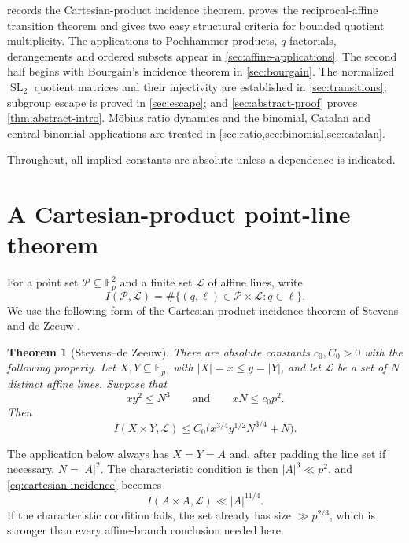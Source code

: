 \documentclass[11pt,reqno]{amsart}
\numberwithin{equation}{section}
\newtheorem{theorem}{Theorem}[section]
\theoremstyle{definition}
\theoremstyle{remark}
\newcommand{\F}{\mathbb F}
\newcommand{\SL}{\operatorname{SL}}
\newcommand{\cL}{\mathcal L}
\newcommand{\cP}{\mathcal P}
\begin{document}
 records the Cartesian-product incidence theorem.   proves the reciprocal-affine transition theorem and gives two easy structural criteria for bounded quotient multiplicity.  The applications to Pochhammer products, $q$-factorials, derangements and ordered subsets appear in \cref{sec:affine-applications}.  The second half begins with Bourgain's incidence theorem in \cref{sec:bourgain}.  The normalized $\SL_2$ quotient matrices and their injectivity are established in \cref{sec:transitions}; subgroup escape is proved in \cref{sec:escape}; and \cref{sec:abstract-proof} proves \cref{thm:abstract-intro}.  M\"obius ratio dynamics and the binomial, Catalan and central-binomial applications are treated in \cref{sec:ratio,sec:binomial,sec:catalan}.

Throughout, all implied constants are absolute unless a dependence is indicated.

\section{A Cartesian-product point-line theorem}\label{sec:pointline}

For a point set $\cP\subseteq\F_p^2$ and a finite set $\cL$ of affine lines, write
\[
  I(\cP,\cL)
  =\#\{(q,\ell)\in\cP\times\cL:q\in\ell\}.
\]
We use the following form of the Cartesian-product incidence theorem of Stevens and de Zeeuw \cite[Theorem~4]{StevensDeZeeuw2017}.

\begin{theorem}[Stevens--de Zeeuw]\label{thm:cartesian-incidence}
There are absolute constants $c_0,C_0>0$ with the following property.  Let $X,Y\subseteq\F_p$, with $|X|=x\le y=|Y|$, and let $\cL$ be a set of $N$ distinct affine lines.  Suppose that
\[
  xy^2\le N^3
  \qquad\text{and}\qquad
  xN\le c_0p^2.
\]
Then
\begin{equation}\label{eq:cartesian-incidence}
  I(X\times Y,\cL)
  \le C_0\bigl(x^{3/4}y^{1/2}N^{3/4}+N\bigr).
\end{equation}
\end{theorem}

The application below always has $X=Y=A$ and, after padding the line set if necessary, $N=|A|^2$.  The characteristic condition is then $|A|^3\ll p^2$, and \eqref{eq:cartesian-incidence} becomes
\begin{equation}\label{eq:cartesian-special}
  I(A\times A,\cL)\ll |A|^{11/4}.
\end{equation}
If the characteristic condition fails, the set already has size $\gg p^{2/3}$, which is stronger than every affine-branch conclusion needed here.
\end{document}
